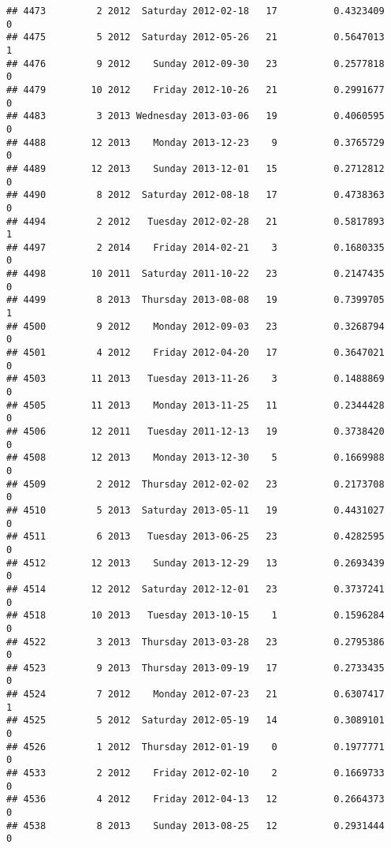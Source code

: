 \documentclass[
]{article}
\begin{document}
\begin{verbatim}
## 4473         2 2012  Saturday 2012-02-18   17          0.4323409             0
## 4475         5 2012  Saturday 2012-05-26   21          0.5647013             1
## 4476         9 2012    Sunday 2012-09-30   23          0.2577818             0
## 4479        10 2012    Friday 2012-10-26   21          0.2991677             0
## 4483         3 2013 Wednesday 2013-03-06   19          0.4060595             0
## 4488        12 2013    Monday 2013-12-23    9          0.3765729             0
## 4489        12 2013    Sunday 2013-12-01   15          0.2712812             0
## 4490         8 2012  Saturday 2012-08-18   17          0.4738363             0
## 4494         2 2012   Tuesday 2012-02-28   21          0.5817893             1
## 4497         2 2014    Friday 2014-02-21    3          0.1680335             0
## 4498        10 2011  Saturday 2011-10-22   23          0.2147435             0
## 4499         8 2013  Thursday 2013-08-08   19          0.7399705             1
## 4500         9 2012    Monday 2012-09-03   23          0.3268794             0
## 4501         4 2012    Friday 2012-04-20   17          0.3647021             0
## 4503        11 2013   Tuesday 2013-11-26    3          0.1488869             0
## 4505        11 2013    Monday 2013-11-25   11          0.2344428             0
## 4506        12 2011   Tuesday 2011-12-13   19          0.3738420             0
## 4508        12 2013    Monday 2013-12-30    5          0.1669988             0
## 4509         2 2012  Thursday 2012-02-02   23          0.2173708             0
## 4510         5 2013  Saturday 2013-05-11   19          0.4431027             0
## 4511         6 2013   Tuesday 2013-06-25   23          0.4282595             0
## 4512        12 2013    Sunday 2013-12-29   13          0.2693439             0
## 4514        12 2012  Saturday 2012-12-01   23          0.3737241             0
## 4518        10 2013   Tuesday 2013-10-15    1          0.1596284             0
## 4522         3 2013  Thursday 2013-03-28   23          0.2795386             0
## 4523         9 2013  Thursday 2013-09-19   17          0.2733435             0
## 4524         7 2012    Monday 2012-07-23   21          0.6307417             1
## 4525         5 2012  Saturday 2012-05-19   14          0.3089101             0
## 4526         1 2012  Thursday 2012-01-19    0          0.1977771             0
## 4533         2 2012    Friday 2012-02-10    2          0.1669733             0
## 4536         4 2012    Friday 2012-04-13   12          0.2664373             0
## 4538         8 2013    Sunday 2013-08-25   12          0.2931444             0

\end{verbatim}
\end{document}
